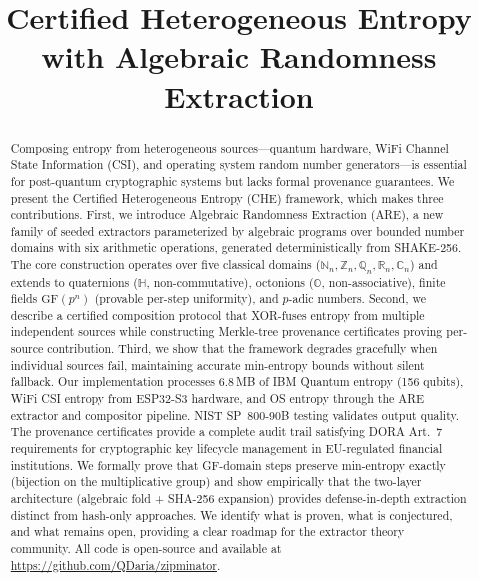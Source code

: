 \documentclass[conference,compsoc]{IEEEtran}
\title{Certified Heterogeneous Entropy with Algebraic Randomness Extraction}
\author{\IEEEauthorblockN{Daniel Mo Houshmand}
\IEEEauthorblockA{QDaria Quantum Research, Oslo, Norway\\
\texttt{mo@qdaria.com}\\
ORCID: 0009-0008-2270-5454}}
\newcommand{\are}{\textsc{ARE}\xspace}
\newcommand{\che}{\textsc{CHE}\xspace}
\newcommand{\N}{\mathbb{N}}
\newcommand{\Z}{\mathbb{Z}}
\newcommand{\Q}{\mathbb{Q}}
\newcommand{\R}{\mathbb{R}}
\newcommand{\CC}{\mathbb{C}}
\begin{document}
\maketitle

\begin{abstract}
Composing entropy from heterogeneous sources---quantum hardware,
WiFi Channel State Information (CSI), and operating system random
number generators---is essential for post-quantum cryptographic
systems but lacks formal provenance guarantees.
%
We present the Certified Heterogeneous Entropy (\che) framework,
which makes three contributions.
%
First, we introduce Algebraic Randomness Extraction (\are), a new
family of seeded extractors parameterized by algebraic programs over
bounded number domains with six arithmetic operations, generated
deterministically from SHAKE-256.
%
The core construction operates over five classical domains
($\N_n, \Z_n, \Q_n, \R_n, \CC_n$) and extends to quaternions
($\mathbb{H}$, non-commutative), octonions ($\mathbb{O}$,
non-associative), finite fields $\mathrm{GF}(p^n)$ (provable
per-step uniformity), and $p$-adic numbers.
%
Second, we describe a certified composition protocol that XOR-fuses
entropy from multiple independent sources while constructing
Merkle-tree provenance certificates proving per-source contribution.
%
Third, we show that the framework degrades gracefully when individual
sources fail, maintaining accurate min-entropy bounds without silent
fallback.
%
Our implementation processes 6.8\,MB of IBM Quantum entropy (156
qubits), WiFi CSI entropy from ESP32-S3 hardware, and OS entropy
through the \are extractor and compositor pipeline.
%
NIST SP~800-90B testing validates output quality.
%
The provenance certificates provide a complete audit trail satisfying
DORA Art.~7 requirements for cryptographic key lifecycle management
in EU-regulated financial institutions.
%
We formally prove that GF-domain steps preserve min-entropy
exactly (bijection on the multiplicative group) and show
empirically that the two-layer architecture (algebraic fold +
SHA-256 expansion) provides defense-in-depth extraction
distinct from hash-only approaches.
%
We identify what is proven, what is conjectured, and what
remains open, providing a clear roadmap for the extractor
theory community.
%
All code is open-source and available at \url{https://github.com/QDaria/zipminator}.
\end{abstract}
\end{document}
